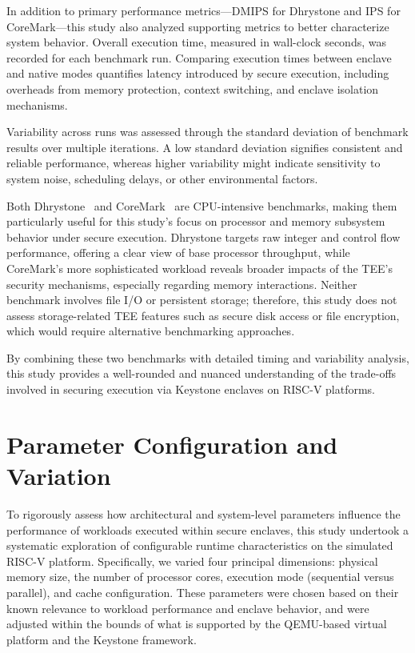 In addition to primary performance metrics—DMIPS for Dhrystone and IPS for CoreMark—this study also analyzed supporting metrics to better characterize system behavior. Overall execution time, measured in wall-clock seconds, was recorded for each benchmark run. Comparing execution times between enclave and native modes quantifies latency introduced by secure execution, including overheads from memory protection, context switching, and enclave isolation mechanisms.

Variability across runs was assessed through the standard deviation of benchmark results over multiple iterations. A low standard deviation signifies consistent and reliable performance, whereas higher variability might indicate sensitivity to system noise, scheduling delays, or other environmental factors.

Both Dhrystone~\cite{weiss2002dhrystone} and CoreMark~\cite{gal2012exploring} are CPU-intensive benchmarks, making them particularly useful for this study’s focus on processor and memory subsystem behavior under secure execution. Dhrystone targets raw integer and control flow performance, offering a clear view of base processor throughput, while CoreMark’s more sophisticated workload reveals broader impacts of the TEE’s security mechanisms, especially regarding memory interactions. Neither benchmark involves file I/O or persistent storage; therefore, this study does not assess storage-related TEE features such as secure disk access or file encryption, which would require alternative benchmarking approaches.

By combining these two benchmarks with detailed timing and variability analysis, this study provides a well-rounded and nuanced understanding of the trade-offs involved in securing execution via Keystone enclaves on RISC-V platforms.

\section{Parameter Configuration and Variation}
\label{sec:param-variation}

To rigorously assess how architectural and system-level parameters influence the performance of workloads executed within secure enclaves, this study undertook a systematic exploration of configurable runtime characteristics on the simulated RISC-V platform. Specifically, we varied four principal dimensions: physical memory size, the number of processor cores, execution mode (sequential versus parallel), and cache configuration. These parameters were chosen based on their known relevance to workload performance and enclave behavior, and were adjusted within the bounds of what is supported by the QEMU-based virtual platform and the Keystone framework.


